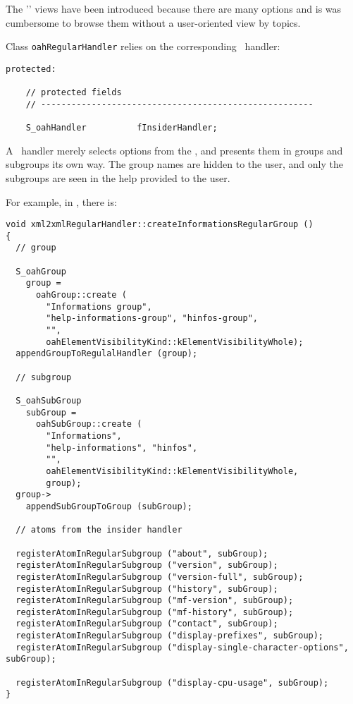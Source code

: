 {The '\regular' views have been introduced because there are many options and is was cumbersome to browse them without a user-oriented view by topics.

Class {\tt oahRegularHandler} relies on the corresponding \insider\ handler:
\begin{lstlisting}[language=CPlusPlus]
  protected:

    // protected fields
    // ------------------------------------------------------

    S_oahHandler          fInsiderHandler;
\end{lstlisting}

A \regular\ handler merely selects options from the , and presents them in groups and subgroups its own way. The group names are hidden to the user, and only the subgroups are seen in the help provided to the user.

For example, in , there is:
\begin{lstlisting}[language=CPlusPlus]
void xml2xmlRegularHandler::createInformationsRegularGroup ()
{
  // group

  S_oahGroup
    group =
      oahGroup::create (
        "Informations group",
        "help-informations-group", "hinfos-group",
        "",
        oahElementVisibilityKind::kElementVisibilityWhole);
  appendGroupToRegulalHandler (group);

  // subgroup

  S_oahSubGroup
    subGroup =
      oahSubGroup::create (
        "Informations",
        "help-informations", "hinfos",
        "",
        oahElementVisibilityKind::kElementVisibilityWhole,
        group);
  group->
    appendSubGroupToGroup (subGroup);

  // atoms from the insider handler

  registerAtomInRegularSubgroup ("about", subGroup);
  registerAtomInRegularSubgroup ("version", subGroup);
  registerAtomInRegularSubgroup ("version-full", subGroup);
  registerAtomInRegularSubgroup ("history", subGroup);
  registerAtomInRegularSubgroup ("mf-version", subGroup);
  registerAtomInRegularSubgroup ("mf-history", subGroup);
  registerAtomInRegularSubgroup ("contact", subGroup);
  registerAtomInRegularSubgroup ("display-prefixes", subGroup);
  registerAtomInRegularSubgroup ("display-single-character-options", subGroup);

  registerAtomInRegularSubgroup ("display-cpu-usage", subGroup);
}
\end{lstlisting}


}
